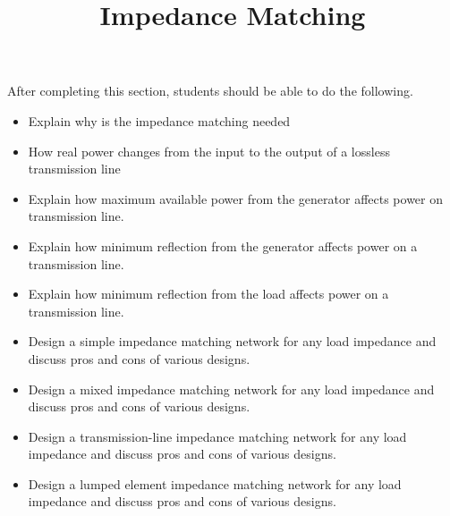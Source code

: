 \documentclass{ximera}
\title{Impedance Matching}
\begin{document}
\begin{abstract}
\end{abstract}

\maketitle

\begin{sectionOutcomes}

After completing this section, students should be able to do the following.

\begin{itemize}
\item Explain why is the impedance matching needed
\item How real power changes from the input to the output of a lossless transmission line
\item Explain how maximum available power from the generator affects power on transmission line.
\item Explain how minimum reflection from the generator affects power on a transmission line.
\item Explain how minimum reflection from the load affects power on a transmission line.
\item Design a simple impedance matching network for any load impedance and discuss pros and cons of various designs.
\item Design a mixed impedance matching network for any load impedance and discuss pros and cons of various designs.
\item Design a transmission-line impedance matching network for any load impedance and discuss pros and cons of various designs.
\item Design a lumped element impedance matching network for any load impedance and discuss pros and cons of various designs.

\end{itemize}

\end{sectionOutcomes}
\end{document}
